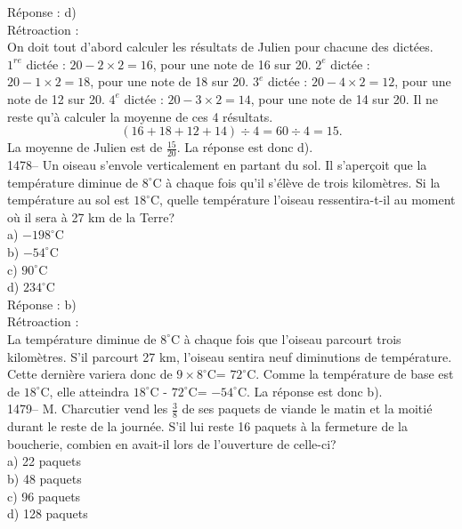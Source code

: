 R\'eponse : d)\\

R\'etroaction :\\
On doit tout d'abord calculer les r\'esultats de Julien pour chacune
des dict\'ees. \\ $1^{re}$ dict\'ee : $20-2\times2=16$, pour une
note de 16 sur 20. \vskip 10pt $2^{e}$ dict\'ee : $20-1\times2=18$,
pour une note de 18 sur 20. \vskip 10pt $3^{e}$ dict\'ee :
$20-4\times2=12$, pour une note de 12 sur 20. \vskip 10pt $4^{e}$
dict\'ee : $20-3\times2=14$, pour une note de 14 sur 20. \vskip 10pt
\noindent Il ne reste qu'\`a calculer la moyenne de ces 4
r\'esultats.
$$(16+18+12+14)\div4=60\div4=15.$$
La moyenne de Julien est de $\frac{15}{20}$. La r\'eponse est donc d).\\

1478-- Un oiseau s'envole verticalement en partant du sol. Il s'aper\c
coit que la temp\'erature diminue de $8^{\circ}$C \`a chaque fois
qu'il s'\'el\`eve de trois kilom\`etres. Si la temp\'erature au sol
est $18^{\circ}$C, quelle temp\'erature l'oiseau ressentira-t-il au
moment o\`u il sera \`a 27
km de la Terre?\\
a) $-198^{\circ}$C\\
b) $-54^{\circ}$C\\
c) $90^{\circ}$C\\
d) $234^{\circ}$C\\

R\'eponse : b)\\

R\'etroaction :\\
La temp\'erature diminue de $8^{\circ}$C \`a chaque fois que
l'oiseau parcourt trois kilom\`etres. S'il parcourt 27 km, l'oiseau
sentira neuf diminutions de temp\'erature. Cette derni\`ere variera
donc de $9\times8^{\circ}$C= $72^{\circ}$C. Comme la temp\'erature
de base est de $18^{\circ}$C, elle atteindra $18^{\circ}$C - $72^{\circ}$C=
$-54^{\circ}$C.
La r\'eponse est donc b).\\

1479-- M. Charcutier vend les $\frac{3}{8}$ de ses paquets de viande
le matin et la moiti\'e durant le reste de la journ\'ee. S'il lui
reste 16 paquets \`a la fermeture de la boucherie, combien en avait-il
lors de l'ouverture de celle-ci?\\
a) 22 paquets\\
b) 48 paquets\\
c) 96 paquets\\
d) 128 paquets\\

